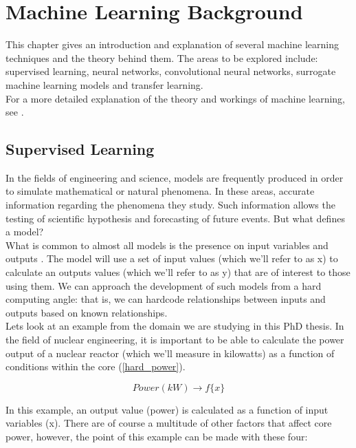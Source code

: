 \chapter{Machine Learning Background}
\label{cha:ML}

This chapter gives an introduction and explanation of several machine learning techniques and the theory behind them. The areas to be explored include: supervised learning, neural networks, convolutional neural networks, surrogate machine learning models and transfer learning. 
\\

\noindent
For a more detailed explanation of the theory and workings of machine learning, see \cite{bishop2006pattern}.


\section{Supervised Learning} \label{supervised}

In the fields of engineering and science, models are frequently produced in order to simulate mathematical or natural phenomena. In these areas, accurate information regarding the phenomena they study. Such information allows the testing of scientific hypothesis and forecasting of future events. But what defines a model? \\

\noindent 
What is common to almost all models is the presence on input variables  and outputs . The model will use a set of input values (which we'll refer to as x) to calculate an outputs values (which we'll refer to as y) that are of interest to those using them. We can approach the development of such models from a hard computing angle: that is, we can hardcode relationships between inputs and outputs based on known relationships. \\

\noindent
Lets look at an example from the domain we are studying in this PhD thesis. In the  field of nuclear engineering, it is important to be able to calculate the power output of a nuclear reactor (which we'll measure in kilowatts) as a function of conditions within the core (\ref{hard_power}).

\begin{equation} \label{hard_power}
	Power(kW)  \rightarrow f\{x\}
\end{equation}

\noindent
In this example, an output value (power) is calculated as a function of input variables (x). There are of course a multitude of other factors that affect core power, however, the point of this example can be made with these four:

